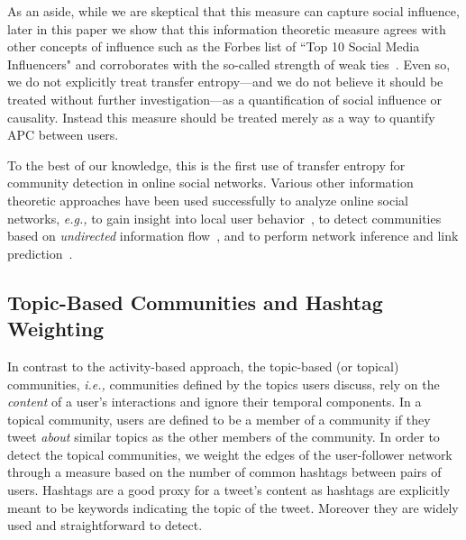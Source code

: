 As an aside, while we are skeptical that this measure can capture social influence, later in this paper we show that this information theoretic measure agrees with other concepts of influence such as the Forbes list of ``Top 10 Social Media Influencers" and corroborates with the so-called strength of weak ties~\cite{granovetter1973strength}. Even so, we do not explicitly treat transfer entropy---and we do not believe it should be treated without further investigation---as a quantification of social influence or causality. Instead this measure should be treated merely as a way to quantify APC between users.%

To the best of our knowledge, this is the first use of transfer entropy for community detection in online social networks. Various other information theoretic approaches have been used successfully to analyze online social networks, \emph{e.g.,} to gain insight into local user behavior~\cite{darmon2013understanding}, to detect communities based on \emph{undirected} information flow~\cite{darmon2013detecting}, and to perform network inference and link prediction~\cite{ver2012information}.




\subsection{Topic-Based Communities and Hashtag Weighting}
\label{sec:method-topic}

In contrast to the activity-based approach, the topic-based (or topical) communities, \emph{i.e.,} communities defined by the topics users discuss, rely on the \emph{content} of a user's interactions and ignore their temporal components. In a topical community, users are defined to be a member of a community if they tweet \emph{about} similar topics as the other members of the community. 
In order to detect the topical communities, we weight the edges of the user-follower network through a measure based on the number of common hashtags between pairs of users. Hashtags are a good proxy for a tweet's content as hashtags are explicitly meant to be keywords indicating the topic of the tweet. Moreover they are widely used and straightforward to detect. 

